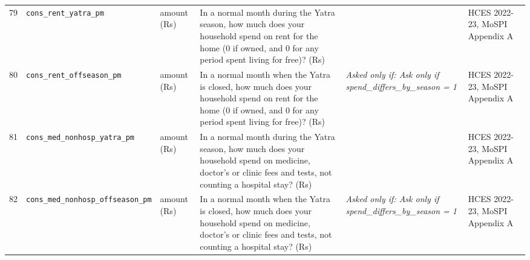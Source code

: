 \documentclass[9pt,a4paper,landscape]{article}
\begin{document}
\begin{longtable}{@{}p{0.5cm}p{3.3cm}p{1.7cm}p{7.3cm}p{5.6cm}p{5.4cm}@{}}
\footnotesize 79 & \footnotesize\texttt{cons\_rent\_yatra\_pm} & \scriptsize amount (Rs) & \footnotesize In a normal month during the Yatra season, how much does your household spend on rent for the home (0 if owned, and 0 for any period spent living for free)? (Rs)\par\vspace{1pt}{\footnotesize\color{hdr}{\hifont यात्रा के मौसम के आम महीने में, आप (और जो यहाँ आपके साथ रहते हैं) घर के किराये पर (अपना घर हो तो 0, और मुफ़्त रहे हों तो भी 0) कितना ख़र्च करते हैं? (रुपये)}} & \scriptsize  & \scriptsize HCES 2022-23, MoSPI Appendix A\\
\footnotesize 80 & \footnotesize\texttt{cons\_rent\_offseason\_pm} & \scriptsize amount (Rs) & \footnotesize In a normal month when the Yatra is closed, how much does your household spend on rent for the home (0 if owned, and 0 for any period spent living for free)? (Rs)\par\vspace{1pt}{\footnotesize\color{hdr}{\hifont जब यात्रा बंद रहती है, उस आम महीने में आपका घर घर के किराये पर (अपना घर हो तो 0, और मुफ़्त रहे हों तो भी 0) कितना ख़र्च करता है? (रुपये)}} & \scriptsize \textit{Asked only if: Ask only if spend\_differs\_by\_season = 1} & \scriptsize HCES 2022-23, MoSPI Appendix A\\
\footnotesize 81 & \footnotesize\texttt{cons\_med\_nonhosp\_yatra\_pm} & \scriptsize amount (Rs) & \footnotesize In a normal month during the Yatra season, how much does your household spend on medicine, doctor's or clinic fees and tests, not counting a hospital stay? (Rs)\par\vspace{1pt}{\footnotesize\color{hdr}{\hifont यात्रा के मौसम के आम महीने में, आप (और जो यहाँ आपके साथ रहते हैं) दवाई, डॉक्टर या क्लीनिक की फ़ीस और जाँच पर, अस्पताल में भर्ती को छोड़कर कितना ख़र्च करते हैं? (रुपये)}} & \scriptsize  & \scriptsize HCES 2022-23, MoSPI Appendix A\\
\footnotesize 82 & \footnotesize\texttt{cons\_med\_nonhosp\_offseason\_pm} & \scriptsize amount (Rs) & \footnotesize In a normal month when the Yatra is closed, how much does your household spend on medicine, doctor's or clinic fees and tests, not counting a hospital stay? (Rs)\par\vspace{1pt}{\footnotesize\color{hdr}{\hifont जब यात्रा बंद रहती है, उस आम महीने में आपका घर दवाई, डॉक्टर या क्लीनिक की फ़ीस और जाँच पर, अस्पताल में भर्ती को छोड़कर कितना ख़र्च करता है? (रुपये)}} & \scriptsize \textit{Asked only if: Ask only if spend\_differs\_by\_season = 1} & \scriptsize HCES 2022-23, MoSPI Appendix A\\

\end{longtable}
\end{document}
